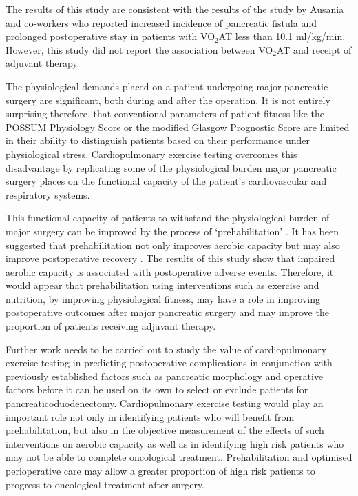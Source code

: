 The results of this study are consistent with the results of the study by Ausania and co-workers \parencite{ausania_effects_2012} who reported increased incidence of pancreatic fistula and prolonged postoperative stay in patients with VO$_2$AT less than 10.1 ml/kg/min. However, this study did not report the association between VO$_2$AT and receipt of adjuvant therapy.

The physiological demands placed on a patient undergoing major pancreatic surgery are significant, both during and after the operation. It is not entirely surprising therefore, that conventional parameters of patient fitness like the POSSUM Physiology Score or the modified Glasgow Prognostic Score are limited in their ability to distinguish patients based on their performance under physiological stress. Cardiopulmonary exercise testing overcomes this disadvantage by replicating some of the physiological burden major pancreatic surgery places on the functional capacity of the patient's cardiovascular and respiratory systems.

This functional capacity of patients to withstand the physiological burden of major surgery can be improved by the process of ‘prehabilitation’ \parencite{topp_effect_2002}. It has been suggested that prehabilitation not only improves aerobic capacity \parencite{jones_effects_2007} but may also improve postoperative recovery \parencite{mayo_impact_2011, pehlivan_effects_2011}. The results of this study show that impaired aerobic capacity is associated with postoperative adverse events. Therefore, it would appear that prehabilitation using interventions such as exercise and nutrition, by improving physiological fitness, may have a role in improving postoperative outcomes after major pancreatic surgery and may improve the proportion of patients receiving adjuvant therapy.

Further work needs to be carried out to study the value of cardiopulmonary exercise testing in predicting postoperative complications in conjunction with previously established factors such as pancreatic morphology and operative factors before it can be used on its own to select or exclude patients for pancreaticoduodenectomy. Cardiopulmonary exercise testing would play an important role not only in identifying patients who will benefit from prehabilitation, but also in the objective measurement of the effects of such interventions on aerobic capacity as well as in identifying high risk patients who may not be able to complete oncological treatment. Prehabilitation and optimised perioperative care may allow a greater proportion of high risk patients to progress to oncological treatment after surgery.